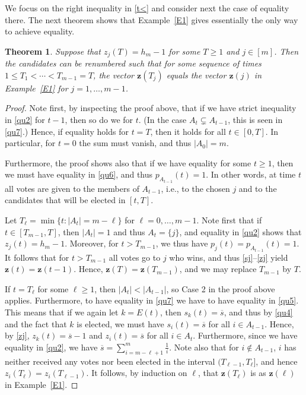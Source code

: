 \documentclass[11pt,reqno,tbtags,a4paper]{amsart}
\numberwithin{equation}{section}
\renewcommand\le{\leq}
\renewcommand\ge{\geq}
\renewcommand\leq{\leqslant}
\renewcommand\geq{\geqslant}
\theoremstyle{plain}%
\newtheorem{theorem}{Theorem}[section]
\theoremstyle{definition}
\theoremstyle{remark}
\newcommand{\refE}[1]{Example~\ref{#1}}
\newcommand\set[1]{\ensuremath{\{#1\}}}
\newcommand\vz{\mathbf{z}}
\newcommand\bs{\overline{s}}
\newcommand\0{{\boldsymbol 0}}
\newcommand\1{{\boldsymbol 1}}
\begin{document}
We focus on the right inequality in \eqref{t<} 
and consider next the case of equality there.
The next theorem shows that \refE{E1} gives essentially the only way to
achieve
equality.
\begin{theorem}\label{TL=}
  Suppose that $z_j(T)=h_m-1$ for some $T\ge1$ and $j\in[m]$.
Then the candidates can be renumbered such that for some sequence of times
$1\le T_1<\dotsm< T_{m-1}= T$,
the vector $\vz(T_j)$ equals the vector
$\vz(j)$ in \refE{E1} for $j=1,\dots,m-1$.
\end{theorem}
\begin{proof}
Note first, by inspecting the proof above, that
if we have strict inequality in \eqref{qu2} for $t-1$, 
then so do we for $t$.
(In the case $A_t\subsetneq A_{t-1}$, this is seen in \eqref{qu7}.)
Hence, if equality holds for $t=T$, then it holds for all $t\in[0,T]$.
In particular, for $t=0$ the sum must vanish, and thus $|A_0|=m$.
%

Furthermore, the proof shows also that if we have equality for some $t\ge1$,
then we must have equality in \eqref{qu6}, and thus $p_{A_{t-1}}(t)=1$.
In other words, at time $t$ all votes are given to the members of $A_{t-1}$,
i.e., to the chosen $j$ and to the candidates that will be elected in $[t,T]$.

Let $T_\ell=\min\set{t:|A_t|=m-\ell}$ for $\ell=0,\dots,m-1$.
Note first that if $t\in[T_{m-1},T]$, then $|A_t|=1$ and thus $A_t=\set j$,
and equality in \eqref{qu2} shows that $z_j(t)=h_m-1$.
Moreover, for $t>T_{m-1}$, we thus have $p_j(t)=p_{A_{t-1}}(t)=1$.
It follows that for $t>T_{m-1}$ all votes go to $j$ who wins, and thus
\eqref{sj}--\eqref{zj} yield
$\vz(t)=\vz(t-1)$. Hence, $\vz(T)=\vz(T_{m-1})$, and we may replace $T_{m-1}$ by $T$.

If $t=T_\ell$ for some $\ell\ge1$, then $|A_t|<|A_{t-1}|$, so Case 2 in the proof
above applies. Furthermore, to have equality in \eqref{qu7}
we have to have equality in \eqref{qu5}. %
This means that if we again let $k=E(t)$, then $s_k(t)=\bs$, and thus by
\eqref{qu4} and the fact that $k$ is elected, we must have $s_i(t)=\bs$ for
all $i\in A_{t-1}$. 
%
Hence, by \eqref{zj}, $z_k(t)=\bs-1$ and $z_i(t)=\bs$ for all $i\in A_t$.
Furthermore, since we have equality in \eqref{qu2}, we have
$\bs=\sum_{i=m-\ell+1}^m\frac{1}{i}$. Note also that for $i\notin A_{t-1}$, 
$i$ has neither received any votes nor been elected in the interval
$(T_{\ell-1},T_\ell]$, and hence $z_i(T_\ell)=z_i(T_{\ell-1})$. 
It follows, by induction on $\ell$, that $\vz(T_\ell)$ is as $\vz(\ell)$ in
\refE{E1}. 
\end{proof}
\end{document}
